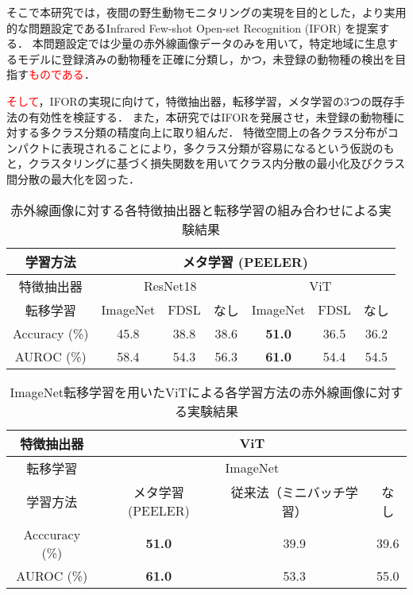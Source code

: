 \documentclass[uplatex,dvipdfmx,10pt,twocolumn]{jsarticle}
\begin{document}
そこで本研究では，夜間の野生動物モニタリングの実現を目的とした，より実用的な問題設定であるInfrared Few-shot Open-set Recognition (IFOR) を提案する．
本問題設定では少量の赤外線画像データのみを用いて，特定地域に生息するモデルに登録済みの動物種を正確に分類し，かつ，未登録の動物種の検出を目指す\textcolor{red}{ものである}．

\textcolor{red}{そして}，IFORの実現に向けて，特徴抽出器，転移学習，メタ学習の3つの既存手法の有効性を検証する．
また，本研究ではIFORを発展させ，未登録の動物種に対する多クラス分類の精度向上に取り組んだ．
特徴空間上の各クラス分布がコンパクトに表現されることにより，多クラス分類が容易になるという仮説のもと，クラスタリングに基づく損失関数を用いてクラス内分散の最小化及びクラス間分散の最大化を図った．

\begin{table*}[tbp]
  \centering
	\caption{赤外線画像に対する各特徴抽出器と転移学習の組み合わせによる実験結果}
  \label{tbl:detection}
	\small
  \begin{tabular}{c||c|c|c|c|c|c}
    \hline
    学習方法            & \multicolumn{6}{c}{メタ学習 (PEELER)}                        \\ \hline
    特徴抽出器           & \multicolumn{3}{c|}{ResNet18} & \multicolumn{3}{c}{ViT}     \\ \hline
    転移学習            &  ImageNet  &  FDSL  &  なし   &   ImageNet    & FDSL & なし  \\ \hline\hline
    Accuracy (\%) &    45.8    &  38.8  &  38.6  & \textbf{51.0} & 36.5 & 36.2 \\
    AUROC (\%)   &    58.4    &  54.3  &  56.3  & \textbf{61.0} & 54.4 & 54.5 \\ \hline
  \end{tabular}
  \vspace{-4mm}
\end{table*}
\begin{table*}[tbp]
  \centering
  \caption{ImageNet転移学習を用いたViTによる各学習方法の赤外線画像に対する実験結果}
  \label{tbl:meta}
	\small
  \begin{tabular}{c||c|c|c}
    \hline
    特徴抽出器          &          \multicolumn{3}{c}{ViT}                \\ \hline
    転移学習            &          \multicolumn{3}{c}{ImageNet}           \\ \hline
    学習方法            & メタ学習 (PEELER)  & 従来法（ミニバッチ学習） & なし  \\ \hline\hline
    Acccuracy (\%)    &  \textbf{51.0}   &        39.9          & 39.6  \\
    AUROC (\%)        &  \textbf{61.0}   &        53.3          & 55.0  \\ \hline
  \end{tabular}
\end{table*}
\end{document}
